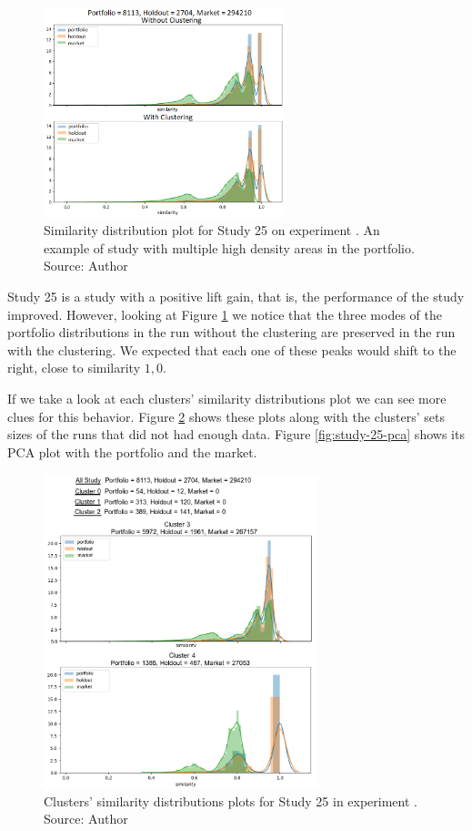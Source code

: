 \begin{figure}[H]
   \centering
   \includegraphics[width=7cm]{fig/ch4-bump-study-25.png}
   \caption{Similarity distribution plot for Study 25 on experiment \nameExperimentII{}. An example of study with multiple high density areas in the portfolio. Source: Author}
   \label{fig:bump-study-25}
\end{figure}

Study 25 is a study with a positive lift gain, that is, the performance of the study improved. However, looking at Figure \ref{fig:bump-study-25} we notice that the three modes of the portfolio distributions in the run without the clustering are preserved in the run with the clustering. We expected that each one of these peaks would shift to the right, close to similarity $1,0$. 

If we take a look at each clusters' similarity distributions plot we can see more clues for this behavior. Figure \ref{fig:study-25-clusters-simi-plot} shows these plots along with the clusters' sets sizes of the runs that did not had enough data. Figure \ref{fig:study-25-pca} shows its PCA plot with the portfolio and the market. 

\begin{figure}[!ht]
   \centering
   \includegraphics[width=8cm]{fig/ch4-study-25-clusters-simi-plot.png}
   \caption{Clusters' similarity distributions plots for Study 25 in experiment \nameExperimentI{}. Source: Author}
   \label{fig:study-25-clusters-simi-plot}
\end{figure}

